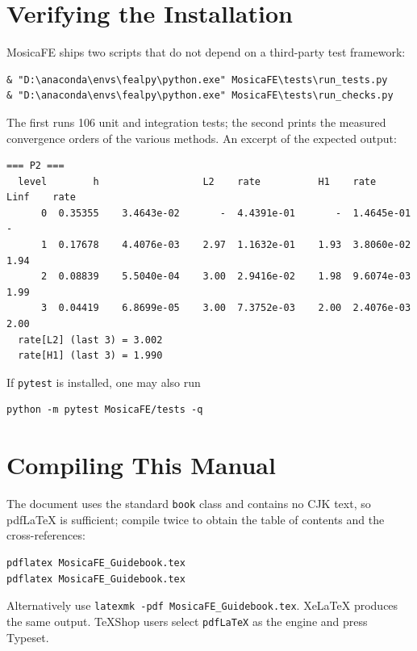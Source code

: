 \documentclass[11pt,oneside]{book}
\theoremstyle{definition}
\theoremstyle{plain}
\newcommand{\mosica}{\textsf{MosicaFE}}
\newcommand{\code}[1]{\texttt{#1}}
\begin{document}
\section{Verifying the Installation}

\mosica{} ships two scripts that do not depend on a third-party test framework:

\begin{lstlisting}[style=shell]
& "D:\anaconda\envs\fealpy\python.exe" MosicaFE\tests\run_tests.py
& "D:\anaconda\envs\fealpy\python.exe" MosicaFE\tests\run_checks.py
\end{lstlisting}

The first runs 106 unit and integration tests; the second prints the measured
convergence orders of the various methods. An excerpt of the expected output:

\begin{lstlisting}[style=textout]
=== P2 ===
  level        h                  L2    rate          H1    rate        Linf    rate
      0  0.35355    3.4643e-02       -  4.4391e-01       -  1.4645e-01       -
      1  0.17678    4.4076e-03    2.97  1.1632e-01    1.93  3.8060e-02    1.94
      2  0.08839    5.5040e-04    3.00  2.9416e-02    1.98  9.6074e-03    1.99
      3  0.04419    6.8699e-05    3.00  7.3752e-03    2.00  2.4076e-03    2.00
  rate[L2] (last 3) = 3.002
  rate[H1] (last 3) = 1.990
\end{lstlisting}

If \code{pytest} is installed, one may also run

\begin{lstlisting}[style=shell]
python -m pytest MosicaFE/tests -q
\end{lstlisting}

\section{Compiling This Manual}

The document uses the standard \code{book} class and contains no CJK text, so
pdfLaTeX{} is sufficient; compile twice to obtain the table of contents and the
cross-references:

\begin{lstlisting}[style=shell]
pdflatex MosicaFE_Guidebook.tex
pdflatex MosicaFE_Guidebook.tex
\end{lstlisting}

Alternatively use \code{latexmk -pdf MosicaFE\_\allowbreak Guidebook.tex}. XeLaTeX{} produces the
same output. TeXShop users select \code{pdfLaTeX} as the engine and press Typeset.
\end{document}
